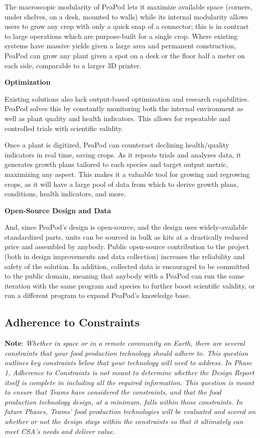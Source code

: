\documentclass{report}
\begin{document}
The macroscopic modularity of PeaPod lets it maximize available space (corners, under shelves, on a desk, mounted to walls) while its internal modularity allows users to grow any crop with only a quick snap of a connector; this is in contrast to large operations which are purpose-built for a single crop. Where existing systems have massive yields given a large area and permanent construction, PeaPod can grow any plant given a spot on a desk or the floor half a meter on each side, comparable to a larger 3D printer.

\textbf{Optimization}

Existing solutions also lack output-based optimization and research capabilities. PeaPod solves this by constantly monitoring both the internal environment as well as plant quality and health indicators. This allows for repeatable and controlled trials with scientific validity.

Once a plant is digitized, PeaPod can counteract declining health/quality indicators in real time, saving crops. As it repeats trials and analyzes data, it generates growth plans tailored to each species and target output metric, maximizing any aspect. This makes it a valuable tool for growing and regrowing crops, as it will have a large pool of data from which to derive growth plans, conditions, health indicators, and more.

\textbf{Open-Source Design and Data}

And, since PeaPod's design is open-source, and the design uses widely-available standardized parts, units can be sourced in bulk as kits at a drastically reduced price and assembled by anybody. Public open-source contribution to the project (both in design improvements and data collection) increases the reliability and safety of the solution. In addition, collected data is encouraged to be committed to the public domain, meaning that anybody with a PeaPod can run the same iteration with the same program and species to further boost scientific validity, or run a different program to expand PeaPod's knowledge base.

\subsection{Adherence to Constraints}
\label{sec:constraints}

\textbf{Note}: \textit{Whether in space or in a remote community on Earth, there are several constraints that your food production technology should adhere to. This question outlines key constraints below that your technology will need to address. In Phase 1, Adherence to Constraints is not meant to determine whether the Design Report itself is complete in including all the required information. This question is meant to ensure that Teams have considered the constraints, and that the food production technology design, at a minimum, falls within those constraints. In future Phases, Teams’ food production technologies will be evaluated and scored on whether or not the design stays within the constraints so that it ultimately can meet CSA’s needs and deliver value.}
\end{document}
